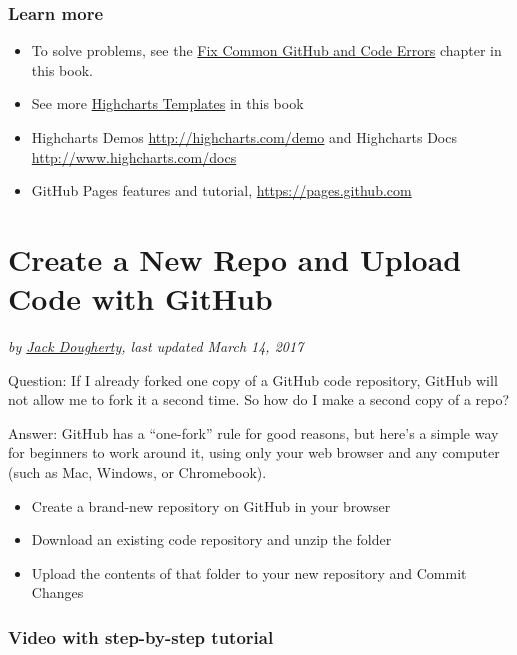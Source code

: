 \documentclass[
  english,
]{book}
\providecommand{\tightlist}{%
  \setlength{\itemsep}{0pt}\setlength{\parskip}{0pt}}
\begin{document}
\hypertarget{learn-more-16}{%
\subsubsection*{Learn more}\label{learn-more-16}}

\begin{itemize}
\tightlist
\item
  To solve problems, see the \href{fix-code}{Fix Common GitHub and Code Errors} chapter in this book.
\item
  See more \href{highcharts}{Highcharts Templates} in this book
\item
  Highcharts Demos \url{http://highcharts.com/demo} and Highcharts Docs \url{http://www.highcharts.com/docs}
\item
  GitHub Pages features and tutorial, \url{https://pages.github.com}
\end{itemize}

\hypertarget{create-repo}{%
\section{Create a New Repo and Upload Code with GitHub}\label{create-repo}}

\emph{by \href{author}{Jack Dougherty}, last updated March 14, 2017}

Question: If I already forked one copy of a GitHub code repository, GitHub will not allow me to fork it a second time. So how do I make a second copy of a repo?

Answer: GitHub has a ``one-fork'' rule for good reasons, but here's a simple way for beginners to work around it, using only your web browser and any computer (such as Mac, Windows, or Chromebook).

\begin{itemize}
\tightlist
\item
  Create a brand-new repository on GitHub in your browser
\item
  Download an existing code repository and unzip the folder
\item
  Upload the contents of that folder to your new repository and Commit Changes
\end{itemize}

\hypertarget{video-with-step-by-step-tutorial-8}{%
\subsubsection*{Video with step-by-step tutorial}\label{video-with-step-by-step-tutorial-8}}
\end{document}
